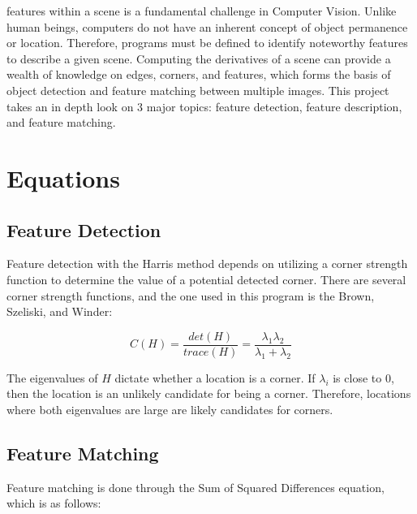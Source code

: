 \documentclass[12pt,journal,compsoc]{IEEEtran}
\begin{document}
% 
% 
% 
% 
 features within a scene is a fundamental challenge in Computer Vision. Unlike human beings, computers do not have an inherent concept of object permanence or location. Therefore, programs must be defined to identify noteworthy features to describe a given scene. Computing the derivatives of a scene can provide a wealth of knowledge on edges, corners, and features, which forms the basis of object detection and feature matching between multiple images. This project takes an in depth look on 3 major topics: feature detection, feature description, and feature matching. 




\section{Equations}

\subsection{Feature Detection}
Feature detection with the Harris method depends on utilizing a corner strength function to determine the value of a potential detected corner. There are several corner strength functions, and the one used in this program is the Brown, Szeliski, and Winder:

$$
C(H) = \frac{det(H)}{trace(H)} = \frac{\lambda_{1}\lambda_{2}}{\lambda_{1}+\lambda_{2}}
$$

The eigenvalues of $H$ dictate whether a location is a corner. If $\lambda_{i}$ is close to 0, then the location is an unlikely candidate for being a corner. Therefore, locations where both eigenvalues are large are likely candidates for corners.

\subsection{Feature Matching}\label{sub:featmat}
Feature matching is done through the Sum of Squared Differences equation, which is as follows:
\end{document}
